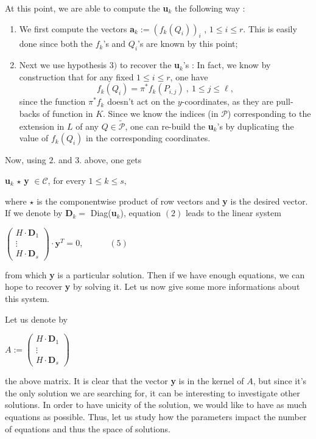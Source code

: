 \documentclass[10pt]{article}
\newcommand{\s}{\vspace{0.3cm}}
\newcommand{\cd}{\cdot}
\newcommand{\PR}{\mathcal{P}}
\begin{document}
At this point, we are able to compute the \textbf{u}$_{k}$ the following way :
\begin{enumerate}
\item We first compute the vectors \textbf{a}$_{k} := (f_k(Q_i))_i$ , $1 \leq i \leq r$. This is easily done since both the $f_k$'s and $Q_i$'s are known by this point;
\item Next we use hypothesis $3)$ to recover the \textbf{u}$_{k}$'s : In fact, we know by construction that for any fixed $1 \leq i \leq r$, one have 
\[f_k(Q_i) = \pi^*f_k(P_{i,j}) \ , \ 1 \leq j \leq \ell,\]
since the function $\pi^*f_k$ doesn't act on the $y$-coordinates, as they are pull-backs of function in $K$. Since we know the indices (in $\PR$) corresponding to the extension in $L$ of any $Q \in \tilde{\PR}$, one can re-build the \textbf{u}$_{k}$'s by duplicating the value of $f_k(Q_i)$ in the corresponding coordinates.
\end{enumerate}

Now, using $2.$ and $3.$ above, one gets 
\begin{center}
\textbf{u}$_{k}$ $\star$ \textbf{y} $\in \mathcal{C}$, for every $1 \leq k \leq s,$
\end{center}
where $\star$ is the componentwise product of row vectors and \textbf{y} is the desired vector.
If we denote by \textbf{D}$_{k} = $ Diag(\textbf{u}$_{k}$), equation $(2)$ leads to the linear system 
\begin{center}
$\begin{pmatrix}
H \cd \textbf{D}_1 \\
\vdots \\
H \cd \textbf{D}_s
\end{pmatrix}
\cd \textbf{y}^T = 0, \quad \quad \quad (5)$
\end{center}
from which \textbf{y} is a particular solution.
Then if we have enough equations, we can hope to recover \textbf{y} by solving it. Let us now give some more informations about this system.

\s

 Let us denote by
\begin{center}
$A := \begin{pmatrix}
H \cd \textbf{D}_1 \\
\vdots \\
H \cd \textbf{D}_s
\end{pmatrix}
$
\end{center}
the above matrix. It is clear that the vector \textbf{y} is in the kernel of $A$, but since it's the only solution we are searching for, it can be interesting to investigate other solutions. In order to have unicity of the solution, we would like to have as much equations as possible. Thus, let us study how the parameters impact the number of equations and thus the space of solutions.
\end{document}
